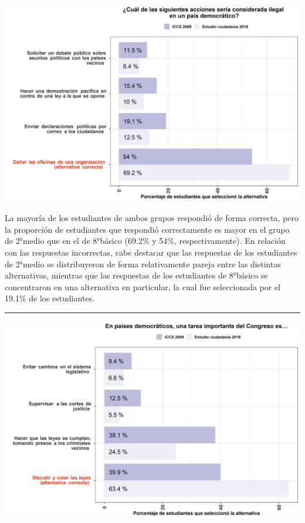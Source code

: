 \documentclass[
  14pt,
]{book}
\let\origfigure\figure
\let\endorigfigure\endfigure
\renewenvironment{figure}[1][2] {
  \expandafter\origfigure\expandafter[H]
} {
  \endorigfigure
}
\begin{document}
\begin{figure}[!ht]

{\centering \includegraphics[width=0.8\linewidth,]{images/graph_p3} 

}

\caption{Comparación con ICCS: Acción ilegal en un país democrático}\label{fig:unnamed-chunk-21}
\end{figure}

La mayoría de los estudiantes de ambos grupos respondió de forma correcta, pero la proporción de estudiantes que respondió correctamente es mayor en el grupo de 2°medio que en el de 8°básico (69.2\% y 54\%, respectivamente). En relación con las respuestas incorrectas, cabe destacar que las respuestas de los estudiantes de 2°medio se distribuyeron de forma relativamente pareja entre las distintas alternativas, mientras que las respuestas de los estudiantes de 8°básico se concentraron en una alternativa en particular, la cual fue seleccionada por el 19.1\% de los estudiantes.

\begin{center}\rule{0.5\linewidth}{0.5pt}\end{center}

\begin{figure}[!ht]

{\centering \includegraphics[width=0.8\linewidth,]{images/graph_p4} 

}

\caption{Comparación con ICCS: Actividad principal del Congreso}\label{fig:unnamed-chunk-22}
\end{figure}
\end{document}
